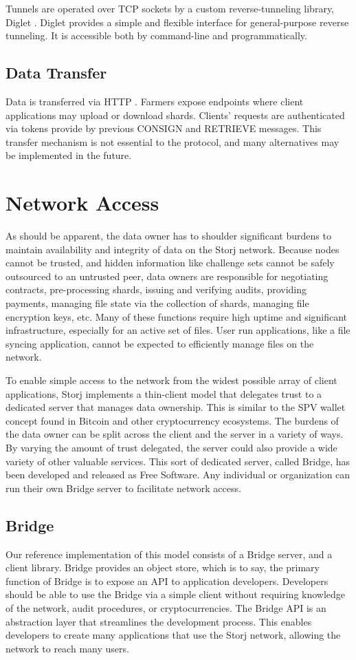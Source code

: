 \documentclass[a4paper,10pt]{article}
\begin{document}
Tunnels are operated over TCP sockets by a custom reverse-tunneling library, Diglet \cite{14}. Diglet provides a simple and flexible interface for general-purpose reverse tunneling. It is accessible both by command-line and programmatically.

\subsection{Data Transfer}
Data is transferred via HTTP \cite{15}. Farmers expose endpoints where client applications may upload or download shards. Clients' requests are authenticated via tokens provide by previous CONSIGN and RETRIEVE messages. This transfer mechanism is not essential to the protocol, and many alternatives may be implemented in the future.


\section{Network Access}
As should be apparent, the data owner has to shoulder significant burdens to maintain availability and integrity of data on the Storj network. Because nodes cannot be trusted, and hidden information like challenge sets cannot be safely outsourced to an untrusted peer, data owners are responsible for negotiating contracts, pre-processing shards, issuing and verifying audits, providing payments, managing file state via the collection of shards, managing file encryption keys, etc. Many of these functions require high uptime and significant infrastructure, especially for an active set of files. User run applications, like a file syncing application, cannot be expected to efficiently manage files on the network.

To enable simple access to the network from the widest possible array of client applications, Storj implements a thin-client model that delegates trust to a dedicated server that manages data ownership. This is similar to the SPV wallet concept found in Bitcoin and other cryptocurrency ecosystems. The burdens of the data owner can be split across the client and the server in a variety of ways. By varying the amount of trust delegated, the server could also provide a wide variety of other valuable services. This sort of dedicated server, called Bridge, has been developed and released as Free Software. Any individual or organization can run their own Bridge server to facilitate network access.

\subsection{Bridge}
Our reference implementation of this model consists of a Bridge server, and a client library. Bridge provides an object store, which is to say, the primary function of Bridge is to expose an API to application developers. Developers should be able to use the Bridge via a simple client without requiring knowledge of the network, audit procedures, or cryptocurrencies. The Bridge API is an abstraction layer that streamlines the development process. This enables developers to create many applications that use the Storj network, allowing the network to reach many users.
\end{document}
